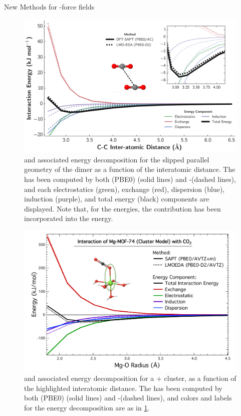 \begin{section}{New Methods for \cus-\mof force fields}
    \begin{figure}
    \centering
    \includegraphics[width=1.0\textwidth]{lmoeda/co2_co2_pes.pdf}
    \caption[\lmoeda vs. \sapt \pes for the \co dimer]
{\pes and associated energy decomposition for the slipped parallel geometry of
the \co dimer as a function of
the  interatomic distance. The \pes has been
computed by both \dftsapt(PBE0) (solid lines) and \lmoeda-\pbeod (dashed
lines), and each electrostatics (green), exchange (red), dispersion (blue),
induction (purple), and total energy (black) components are displayed.
Note that, for the \dftsapt energies, the \dhf contribution has been
incorporated into the \induction energy.
            }
    \label{fig:lmoeda-co2_co2}
    \end{figure}

    \begin{figure}
    \centering
    \includegraphics[width=1.0\textwidth]{lmoeda/co2_mgmof_pes.pdf}
    \caption[\lmoeda vs. \sapt \pes for the \co/\mgmof dimer ]
{\pes and associated energy decomposition for a \co +  cluster, 
as a function of the highlighted  interatomic distance. 
The \pes has been
computed by both \dftsapt(PBE0) (solid lines) and \lmoeda-\pbeod (dashed
lines), and colors and labels for the energy decomposition are as in
\cref{fig:lmoeda-co2_co2}. 
            }
    \label{fig:lmoeda-co2_mgmof}
    \end{figure}


\end{section}
